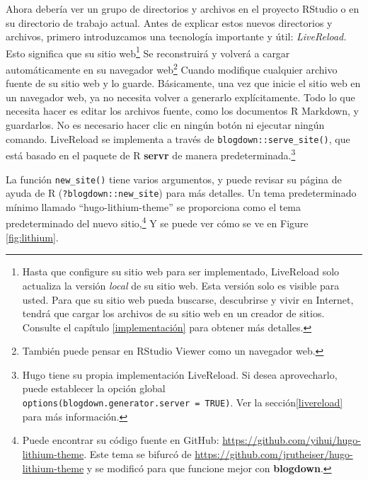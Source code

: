 \documentclass[12pt,]{krantz}
\theoremstyle{definition}
\theoremstyle{definition}
\theoremstyle{definition}
\theoremstyle{remark}
\begin{document}
Ahora debería ver un grupo de directorios y archivos en el proyecto
RStudio o en su directorio de trabajo actual. Antes de explicar estos
nuevos directorios y archivos, primero introduzcamos una tecnología
importante y útil: \emph{LiveReload.} Esto significa
que su sitio web\footnote{Hasta que configure su sitio web para ser
  implementado, LiveReload solo actualiza la versión \emph{local} de su
  sitio web. Esta versión solo es visible para usted. Para que su sitio
  web pueda buscarse, descubrirse y vivir en Internet, tendrá que cargar
  los archivos de su sitio web en un creador de sitios. Consulte el
  capítulo \ref{implementación} para obtener más detalles.} Se
reconstruirá y volverá a cargar automáticamente en su navegador
web\footnote{También puede pensar en RStudio Viewer como un navegador
  web.} Cuando modifique cualquier archivo fuente de su sitio web y lo
guarde. Básicamente, una vez que inicie el sitio web en un navegador
web, ya no necesita volver a generarlo explícitamente. Todo lo que
necesita hacer es editar los archivos fuente, como los documentos R
Markdown, y guardarlos. No es necesario hacer clic en ningún botón ni
ejecutar ningún comando. LiveReload se implementa a través de
\texttt{blogdown::serve\_site()}, que
está basado en el paquete de R \textbf{servr} \citep{R-servr} de manera
predeterminada.\footnote{Hugo tiene su propia implementación LiveReload.
  Si desea aprovecharlo, puede establecer la opción global
  \texttt{options(blogdown.generator.server\ =\ TRUE)}. Ver la
  sección\ref{livereload} para más información.}

La función \texttt{new\_site()} tiene varios argumentos, y puede revisar
su página de ayuda de R (\texttt{?blogdown::new\_site}) para más
detalles. Un tema predeterminado mínimo llamado ``hugo-lithium-theme''
se proporciona como el tema predeterminado del nuevo sitio,\footnote{Puede
  encontrar su código fuente en GitHub:
  \url{https://github.com/yihui/hugo-lithium-theme}. Este tema se
  bifurcó de \url{https://github.com/jrutheiser/hugo-lithium-theme} y se
  modificó para que funcione mejor con \textbf{blogdown}.} Y se puede
ver cómo se ve en Figure \ref{fig:lithium}.
\end{document}
